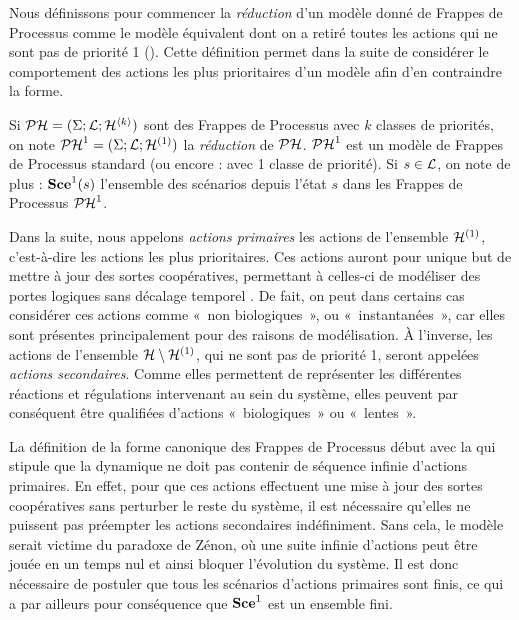 Nous définissons pour commencer la \emph{réduction} d'un modèle donné de Frappes de Processus
comme le modèle équivalent dont on a retiré toutes les actions qui ne sont pas de priorité 1
().
Cette définition permet dans la suite de considérer le comportement des actions les plus prioritaires
d'un modèle afin d'en contraindre la forme.

\begin{definition}
  Si $\PH = (\PHs; \PHl; \PHh^{\langle k \rangle})$ sont des Frappes de Processus avec $k$
  classes de priorités, on note $\reduction[\PH] = (\PHs; \PHl; \PHh^{(1)})$
  la \emph{réduction} de $\PH$.
  $\reduction$ est un modèle de Frappes de Processus standard
  (ou encore : avec 1 classe de priorité).
  Si $s \in \PHl$, on note de plus : $\reduction[\Sce](s)$ l'ensemble des scénarios
  depuis l'état $s$ dans les Frappes de Processus $\reduction$.
\end{definition}


Dans la suite, nous appelons \emph{actions primaires} les actions de l'ensemble $\PHh^{(1)}$,
c'est-à-dire les actions les plus prioritaires.
Ces actions auront pour unique but de mettre à jour des sortes coopératives, permettant
à celles-ci de modéliser des portes logiques sans décalage temporel .
De fait, on peut dans certains cas considérer ces actions comme «~non biologiques~»,
ou «~instantanées~»,
car elles sont présentes principalement pour des raisons de modélisation.
À l'inverse, les actions de l'ensemble $\PHh \setminus \PHh^{(1)}$, qui ne sont pas de priorité 1,
seront appelées \emph{actions secondaires}.
Comme elles permettent de représenter les différentes réactions et régulations intervenant au sein du
système, elles peuvent par conséquent être qualifiées d'actions «~biologiques~» ou «~lentes~».

La définition de la forme canonique des Frappes de Processus début avec la
 qui stipule que la dynamique ne doit pas contenir de séquence infinie
d'actions primaires.
En effet, pour que ces actions effectuent une mise à jour des sortes coopératives sans perturber
le reste du système, il est nécessaire qu'elles ne puissent pas préempter les actions secondaires
indéfiniment.
Sans cela, le modèle serait victime du paradoxe de Zénon,
où une suite infinie d'actions peut être jouée en un temps nul et ainsi
bloquer l'évolution du système.
Il est donc nécessaire de postuler que tous les scénarios d'actions primaires sont finis,
ce qui a par ailleurs pour conséquence que $\reductionsce$ est un ensemble fini.

